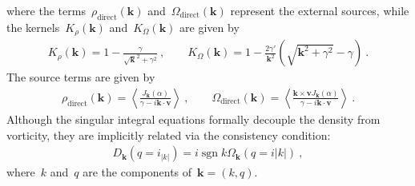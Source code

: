 \documentclass[preprint,aps,eqsecnum]{revtex4-1}
\newcommand{\sgn}{\mathop{\mathrm{sgn}}\nolimits}
\begin{document}
where the terms~$ \rho_\mathrm{direct}({\bm k})$
and~$\Omega_\mathrm{direct}({\bm k})$ represent the external
sources, while the kernels~$K_\rho({\bm k})$ and~$K_\Omega({\bm k})$
are given by
\begin{align}
  K_\rho({\bm k}) = 1 - \frac{\gamma}{\sqrt{\bm k}^2 + \gamma^2}\ ,
  \qquad
  K_\Omega({\bm k}) = 1 - \frac{2\gamma'}{{\bm k}^2}
  \left(\sqrt{{\bm k}^2 + \gamma^2} - \gamma\right)\ . 
\end{align}
The source terms are given by
\begin{align}
  \rho_\mathrm{direct}({\bm k})
  = \left\langle \frac{J_{\bm k}(\alpha)}{\gamma -i {\bm k}\cdot{\bm v}} \right\rangle
  \ ,
  \qquad
  \Omega_\mathrm{direct}({\bm k}) =
  \left\langle \frac{{\bm k}\times{\bm v} J_{\bm k}(\alpha)}{
       \gamma -i {\bm k}\cdot{\bm v}} \right\rangle \ . 
\end{align}
Although the singular integral equations formally decouple the density
from vorticity, they are implicitly related via the
consistency condition:
\begin{align}
  D_{\bm k}(q = i_|k|) = i \sgn k \Omega_{\bm k}(q = i |k|)\ , 
\end{align}
where~$k$ and~$q$ are the components of~${\bm k} = (k, q)$. 
\end{document}
